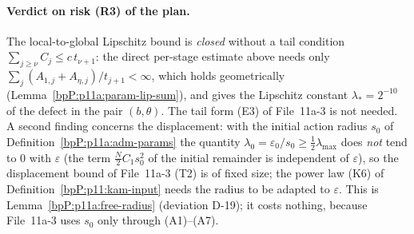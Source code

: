 \paragraph{Verdict on risk (R3) of the plan.} The local-to-global Lipschitz bound is \emph{closed} without a tail condition $\sum_{j\ge\nu}C_j\le c\,t_{\nu+1}$: the direct per-stage estimate above needs only $\sum_j(A_{1,j}+A_{\eta,j})/t_{j+1}<\infty$, which holds geometrically (Lemma~\ref{bpP:p11a:param-lip-sum}), and gives the Lipschitz constant $\lambda_*=2^{-10}$ of the defect in the pair $(b,\theta)$. The tail form (E3) of File~11a-3 is not needed. A second finding concerns the displacement: with the initial action radius $s_0$ of Definition~\ref{bpP:p11a:adm-params} the quantity $\lambda_0=\varepsilon_0/s_0\ge\frac12\lambda_{\max}$ does \emph{not} tend to $0$ with $\varepsilon$ (the term $\frac N2C_1s_0^2$ of the initial remainder is independent of $\varepsilon$), so the displacement bound of File~11a-3 (T2) is of fixed size; the power law (K6) of Definition~\ref{bpP:p11:kam-input} needs the radius to be adapted to $\varepsilon$. This is Lemma~\ref{bpP:p11a:free-radius} (deviation D-19); it costs nothing, because File~11a-3 uses $s_0$ only through (A1)--(A7).

